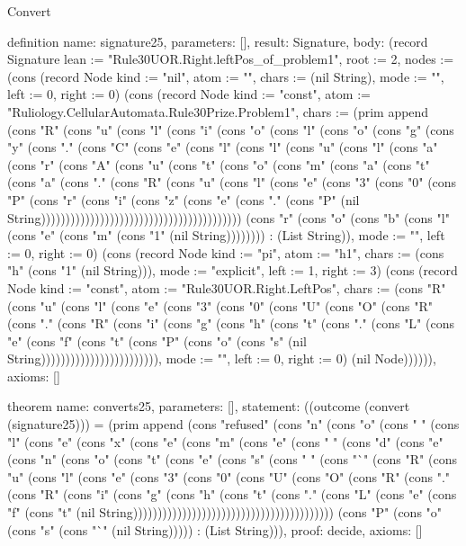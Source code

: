 \begin{lexlean}{Convert}
\begin{semanticmodule}
definition{
  name: signature25,
  parameters: [],
  result: Signature,
  body: (record Signature {lean := "Rule30UOR.Right.leftPos_of_problem1", root := 2, nodes := (cons (record Node {kind := "nil", atom := "", chars := (nil String), mode := "", left := 0, right := 0}) (cons (record Node {kind := "const", atom := "Ruliology.CellularAutomata.Rule30Prize.Problem1", chars := (prim append (cons "R" (cons "u" (cons "l" (cons "i" (cons "o" (cons "l" (cons "o" (cons "g" (cons "y" (cons "." (cons "C" (cons "e" (cons "l" (cons "l" (cons "u" (cons "l" (cons "a" (cons "r" (cons "A" (cons "u" (cons "t" (cons "o" (cons "m" (cons "a" (cons "t" (cons "a" (cons "." (cons "R" (cons "u" (cons "l" (cons "e" (cons "3" (cons "0" (cons "P" (cons "r" (cons "i" (cons "z" (cons "e" (cons "." (cons "P" (nil String))))))))))))))))))))))))))))))))))))))))) (cons "r" (cons "o" (cons "b" (cons "l" (cons "e" (cons "m" (cons "1" (nil String)))))))) : (List String)), mode := "", left := 0, right := 0}) (cons (record Node {kind := "pi", atom := "h1", chars := (cons "h" (cons "1" (nil String))), mode := "explicit", left := 1, right := 3}) (cons (record Node {kind := "const", atom := "Rule30UOR.Right.LeftPos", chars := (cons "R" (cons "u" (cons "l" (cons "e" (cons "3" (cons "0" (cons "U" (cons "O" (cons "R" (cons "." (cons "R" (cons "i" (cons "g" (cons "h" (cons "t" (cons "." (cons "L" (cons "e" (cons "f" (cons "t" (cons "P" (cons "o" (cons "s" (nil String)))))))))))))))))))))))), mode := "", left := 0, right := 0}) (nil Node)))))}),
  axioms: []
}

theorem{
  name: converts25,
  parameters: [],
  statement: ((outcome (convert (signature25))) = (prim append (cons "refused" (cons "n" (cons "o" (cons " " (cons "l" (cons "e" (cons "x" (cons "e" (cons "m" (cons "e" (cons " " (cons "d" (cons "e" (cons "n" (cons "o" (cons "t" (cons "e" (cons "s" (cons " " (cons "`" (cons "R" (cons "u" (cons "l" (cons "e" (cons "3" (cons "0" (cons "U" (cons "O" (cons "R" (cons "." (cons "R" (cons "i" (cons "g" (cons "h" (cons "t" (cons "." (cons "L" (cons "e" (cons "f" (cons "t" (nil String))))))))))))))))))))))))))))))))))))))))) (cons "P" (cons "o" (cons "s" (cons "`" (nil String))))) : (List String))),
  proof: decide{},
  axioms: []
}


\end{semanticmodule}
\end{lexlean}
